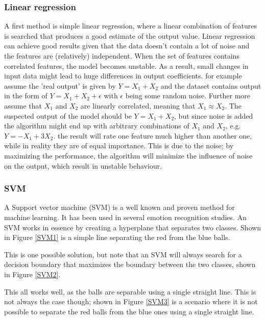 \subsubsection{Linear regression}

A first method is simple linear regression, where a linear combination of features is searched that produces a good estimate of the output value. Linear regression can achieve good results given that the data doesn't contain a lot of noise and the features are (relatively) independent. When the set of features contains correlated features, the model becomes unstable. As a result, small changes in input data might lead to huge differences in output coefficients. for example assume the 'real output' is given by $Y = X_1 + X_2$ and the dataset contains output in the form of $Y = X_1 + X_2 + \epsilon$ with $\epsilon$ being some random noise. Further more assume that $X_1$ and $X_2$ are linearly correlated, meaning that $X_1 \approx X_2$. The suspected output of the model should be $Y = X_1 + X_2$, but since noise is added the algorithm might end up with arbitrary combinations of $X_1$ and $X_2$, e.g. $Y = -X_1 + 3X_2$. the result will rate one feature much higher than another one, while in reality they are of equal importance. This is due to the noise; by maximizing the performance, the algorithm will minimize the influence of noise on the output, which result in unstable behaviour.

\subsubsection{SVM}

A Support vector machine (SVM) is a well known and proven method for machine learning. It has been used in several emotion recognition studies. An SVM works in essence by creating a hyperplane that separates two classes. Shown in Figure \ref{SVM1} is a simple line separating the red from the blue balls.


This is one possible solution, but note that an SVM will always search for a decision boundary that maximizes the boundary between the two classes, shown in Figure \ref{SVM2}.


This all works well, as the balls are separable using a single straight line. This is not always the case though; shown in Figure \ref{SVM3} is a scenario where it is not possible to separate the red balls from the blue ones using a single straight line.

